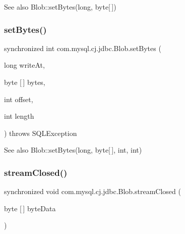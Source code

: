 \begin{DoxySeeAlso}{See also}
Blob\+::set\+Bytes(long, byte\mbox{[}$\,$\mbox{]}) 
\end{DoxySeeAlso}
\mbox{\label{classcom_1_1mysql_1_1cj_1_1jdbc_1_1_blob_a5c16cdab1cc1ff37a3b1267dec9d6b28}} 
\subsubsection{\texorpdfstring{set\+Bytes()}{setBytes()}\hspace{0.1cm}{\footnotesize\ttfamily [2/2]}}
{\footnotesize\ttfamily synchronized int com.\+mysql.\+cj.\+jdbc.\+Blob.\+set\+Bytes (\begin{DoxyParamCaption}\item[{long}]{write\+At,  }\item[{byte \mbox{[}$\,$\mbox{]}}]{bytes,  }\item[{int}]{offset,  }\item[{int}]{length }\end{DoxyParamCaption}) throws S\+Q\+L\+Exception}

\begin{DoxySeeAlso}{See also}
Blob\+::set\+Bytes(long, byte\mbox{[}$\,$\mbox{]}, int, int) 
\end{DoxySeeAlso}
\mbox{\label{classcom_1_1mysql_1_1cj_1_1jdbc_1_1_blob_a13587ebf1755da02db82fb506459e225}} 
\subsubsection{\texorpdfstring{stream\+Closed()}{streamClosed()}\hspace{0.1cm}{\footnotesize\ttfamily [1/2]}}
{\footnotesize\ttfamily synchronized void com.\+mysql.\+cj.\+jdbc.\+Blob.\+stream\+Closed (\begin{DoxyParamCaption}\item[{byte \mbox{[}$\,$\mbox{]}}]{byte\+Data }\end{DoxyParamCaption})}

